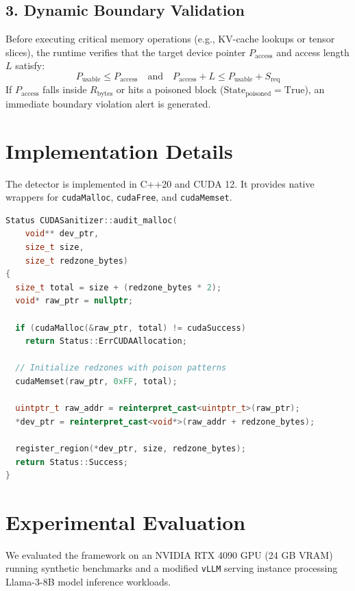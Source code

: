 \documentclass[10pt,twocolumn,a4paper]{article}
\begin{document}
\subsection{3. Dynamic Boundary Validation}
Before executing critical memory operations (e.g., KV-cache lookups or tensor slices), the runtime verifies that the target device pointer $P_{\text{access}}$ and access length $L$ satisfy:
\begin{equation}
P_{\text{usable}} \le P_{\text{access}} \quad \text{and} \quad P_{\text{access}} + L \le P_{\text{usable}} + S_{\text{req}}
\end{equation}
If $P_{\text{access}}$ falls inside $R_{\text{bytes}}$ or hits a poisoned block ($\text{State}_{\text{poisoned}} = \text{True}$), an immediate boundary violation alert is generated.

\section{Implementation Details}
The detector is implemented in C++20 and CUDA 12. It provides native wrappers for \texttt{cudaMalloc}, \texttt{cudaFree}, and \texttt{cudaMemset}.

\begin{lstlisting}[language=C++, caption={VRAM Allocation & Redzone Injection Logic}]
Status CUDASanitizer::audit_malloc(
    void** dev_ptr, 
    size_t size, 
    size_t redzone_bytes) 
{
  size_t total = size + (redzone_bytes * 2);
  void* raw_ptr = nullptr;
  
  if (cudaMalloc(&raw_ptr, total) != cudaSuccess)
    return Status::ErrCUDAAllocation;

  // Initialize redzones with poison patterns
  cudaMemset(raw_ptr, 0xFF, total);

  uintptr_t raw_addr = reinterpret_cast<uintptr_t>(raw_ptr);
  *dev_ptr = reinterpret_cast<void*>(raw_addr + redzone_bytes);

  register_region(*dev_ptr, size, redzone_bytes);
  return Status::Success;
}
\end{lstlisting}

\section{Experimental Evaluation}
We evaluated the framework on an NVIDIA RTX 4090 GPU (24 GB VRAM) running synthetic benchmarks and a modified \texttt{vLLM} serving instance processing Llama-3-8B model inference workloads.
\end{document}

